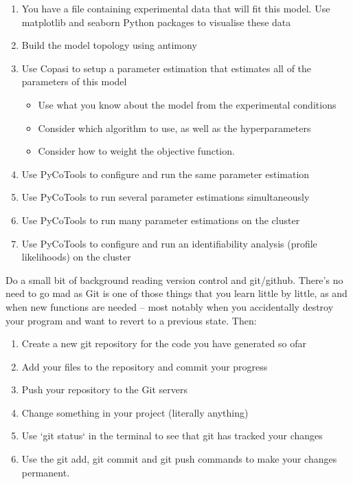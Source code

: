 \documentclass[11pt]{article}
\begin{document}
    \begin{enumerate}
        \item You have a file containing experimental data that will fit this model. Use matplotlib and seaborn Python packages to visualise these data
        \item Build the model topology using antimony
        \item Use Copasi to setup a parameter estimation that estimates all of the parameters of this model
        \begin{itemize}
            \item Use what you know about the model from the experimental conditions
            \item Consider which algorithm to use, as well as the hyperparameters
            \item Consider how to weight the objective function.
        \end{itemize}
        \item Use PyCoTools to configure and run the same parameter estimation
        \item Use PyCoTools to run several parameter estimations simultaneously
        \item Use PyCoTools to run many parameter estimations on the cluster
        \item Use PyCoTools to configure and run an identifiability analysis (profile likelihoods) on the cluster
    \end{enumerate}

    Do a small bit of background reading version control and git/github. There's no need to go mad
    as Git is one of those things that you learn little by little, as and when new functions are needed -- most notably
    when you accidentally destroy your program and want to revert to a previous state. Then:

    \begin{enumerate}
        \item Create a new git repository for the code you have generated so ofar
        \item Add your files to the repository and commit your progress
        \item Push your repository to the Git servers
        \item Change something in your project (literally anything)
        \item Use `git status` in the terminal to see that git has tracked your changes
        \item Use the git add, git commit and git push commands to make your changes permanent.
    \end{enumerate}
\end{document}
